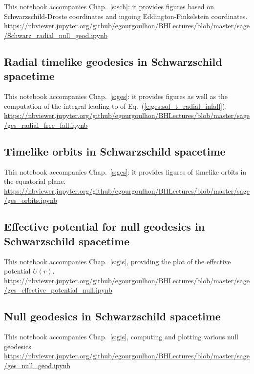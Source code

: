 This notebook accompanies Chap.~\ref{s:sch}: it provides figures based on
Schwarzschild-Droste coordinates and ingoing Eddington-Finkelstein coordinates.\\[1ex]
{\footnotesize
\url{https://nbviewer.jupyter.org/github/egourgoulhon/BHLectures/blob/master/sage/Schwarz_radial_null_geod.ipynb}
}

\subsection{Radial timelike geodesics in Schwarzschild spacetime} \label{s:sam:ges_radial_free_fall}

This notebook accompanies Chap.~\ref{s:ges}: it provides
figures as well as the computation of
the integral leading to
of Eq.~(\ref{e:ges:sol_t_radial_infall}).\\[1ex]
{\footnotesize
\url{https://nbviewer.jupyter.org/github/egourgoulhon/BHLectures/blob/master/sage/ges_radial_free_fall.ipynb}
}

\subsection{Timelike orbits in Schwarzschild spacetime} \label{s:sam:ges_orbits}
%
This notebook accompanies Chap.~\ref{s:ges}: it provides
figures of timelike orbits in the equatorial plane.\\[1ex]
{\footnotesize
\url{https://nbviewer.jupyter.org/github/egourgoulhon/BHLectures/blob/master/sage/ges_orbits.ipynb}
}

\subsection{Effective potential for null geodesics in Schwarzschild spacetime} \label{s:sam:ges_eff_pot_null}
%
This notebook accompanies Chap.~\ref{s:gis}, providing the plot of the
effective potential $U(r)$.\\[1ex]
{\footnotesize
\url{https://nbviewer.jupyter.org/github/egourgoulhon/BHLectures/blob/master/sage/ges_effective_potential_null.ipynb}
}

\subsection{Null geodesics in Schwarzschild spacetime} \label{s:sam:ges_null_geod}
%
This notebook accompanies Chap.~\ref{s:gis}, computing and plotting various
null geodesics.\\[1ex]
{\footnotesize
\url{https://nbviewer.jupyter.org/github/egourgoulhon/BHLectures/blob/master/sage/ges_null_geod.ipynb}
}

